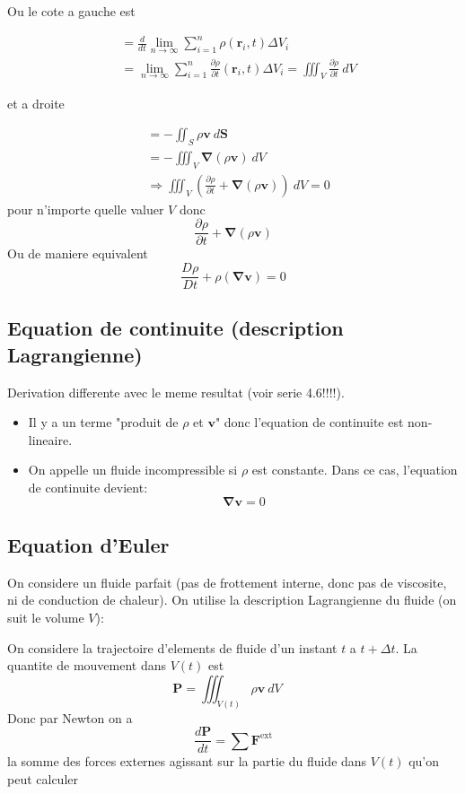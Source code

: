 Ou  le cote a gauche est 

\begin{align}
 & =\frac{d}{dt}\lim_{ n \to \infty } \sum_{i=1}^{n} \rho(\boldsymbol{r}_{i},t)\Delta V_{i} \\
 & =\lim_{ n \to \infty } \sum_{i=1}^{n} \frac{ \partial \rho }{ \partial t } (\boldsymbol{r}_{i},t)\Delta V_{i} =\iiint _{V}\frac{ \partial \rho }{ \partial t } ~dV 
\end{align}

et a droite

\begin{align}
 & =-\iint _{S}\rho \boldsymbol{v}~d\boldsymbol{S} \\
 & =-\iiint _{V}\boldsymbol{\nabla}(\rho \boldsymbol{v})~dV \\
 & \Rightarrow \iiint _{V}\left( \frac{ \partial \rho }{ \partial t } +\boldsymbol{\nabla}(\rho \boldsymbol{v}) \right)~dV=0
\end{align}
pour n'importe quelle valuer $V$ donc
$$
\frac{ \partial \rho }{ \partial t } +\boldsymbol{\nabla}(\rho \boldsymbol{v})
$$
Ou de maniere equivalent 
$$
\frac{D\rho}{Dt}+\rho(\boldsymbol{\nabla v})=0
$$
\subsection{Equation de continuite (description Lagrangienne)}

Derivation differente avec le meme resultat (voir serie 4.6!!!!).
\begin{remark}
\begin{itemize}
\item Il y a un terme "produit de $\rho$ et $\boldsymbol{v}$" donc l'equation de continuite est non-lineaire.
\item On appelle un fluide incompressible si $\rho$ est constante. Dans ce cas, l'equation de continuite devient:
$$
\boldsymbol{\nabla v}=0
$$
\end{itemize}
\end{remark}

\subsection{Equation d'Euler}
On considere un fluide parfait (pas de frottement interne, donc pas de viscosite, ni de conduction de chaleur). On utilise la description Lagrangienne du fluide (on suit le volume $V$): 

On considere la trajectoire d'elements de fluide d'un instant $t$ a $t+\Delta t$. La quantite de mouvement dans $V(t)$ est
$$
\boldsymbol{P}=\iiint _{V(t)} \rho \boldsymbol{v}~dV\quad
$$
Donc par Newton on a
$$
\frac{d\boldsymbol{P}}{dt}=\sum \boldsymbol{F}^{\mathrm{ext}}
$$
la somme des forces externes agissant sur la partie du fluide dans $V(t)$ qu'on peut calculer

